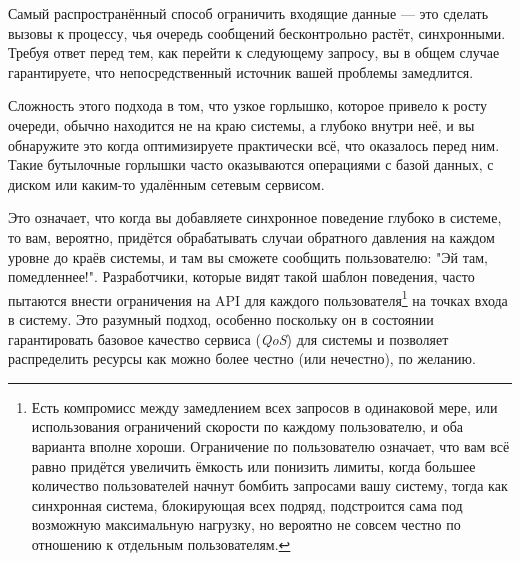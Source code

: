 Самый распространённый способ ограничить входящие данные --- это сделать вызовы к процессу, чья очередь сообщений бесконтрольно растёт, синхронными. Требуя ответ перед тем, как перейти к следующему запросу, вы в общем случае гарантируете, что непосредственный источник вашей проблемы замедлится.

Сложность этого подхода в том, что узкое горлышко, которое привело к росту очереди, обычно находится не на краю системы, а глубоко внутри неё, и вы обнаружите это когда оптимизируете практически всё, что оказалось перед ним. Такие бутылочные горлышки часто оказываются операциями с базой данных, с диском или каким-то удалённым сетевым сервисом.

Это означает, что когда вы добавляете синхронное поведение глубоко в системе, то вам, вероятно, придётся обрабатывать случаи обратного давления на каждом уровне до краёв системы, и там вы сможете сообщить пользователю: "Эй там, помедленнее!".
Разработчики, которые видят такой шаблон поведения, часто пытаются внести ограничения на API для каждого пользователя\footnote{Есть компромисс между замедлением всех запросов в одинаковой мере, или использования ограничений скорости по каждому пользователю, и оба варианта вполне хороши. Ограничение по пользователю означает, что вам всё равно придётся увеличить ёмкость или понизить лимиты, когда большее количество пользователей начнут бомбить запросами вашу систему, тогда как синхронная система, блокирующая всех подряд, подстроится сама под возможную максимальную нагрузку, но вероятно не совсем честно по отношению к отдельным пользователям.} на точках входа в систему. Это разумный подход, особенно поскольку он в состоянии гарантировать базовое качество сервиса (\emph{QoS}) для системы и позволяет распределить ресурсы как можно более честно (или нечестно), по желанию.

